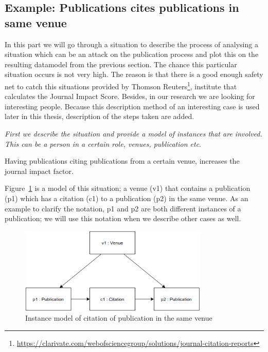 \documentclass{ou-report}
\begin{document}
\subsection{Example: Publications cites publications in same venue}
\label{interesting_case:publications_cites_publications_in_same_venue}
In this part we will go through a situation to describe the process of analysing
a situation which can be an attack on the publication process and plot this on the
resulting datamodel from the previous section. The chance this 
particular situation occurs is not very high. The reason is that there is a good
enough safety net to catch this situations provided by Thomson Reuters\footnote{\url{https://clarivate.com/webofsciencegroup/solutions/journal-citation-reports}}, 
institute that 
calculates the Journal Impact Score. Besides, in our research we are looking for
interesting people. Because this description method of an interesting case is
used later in this thesis, description of the steps taken are added. 

\textit{First we describe the situation and provide a model of instances that 
are involved. This can be a person in a certain role, venues, publication etc}.

Having publications citing publications from a certain venue, increases the 
journal impact factor.

Figure~\ref{fig:cpsv} is a model of this situation; a venue (v1) that
contains a publication (p1) which has a citation (c1) to a publication (p2) in
the same venue. As an example to clarify the notation, p1 and p2 are both 
different instances of a publication; we will use this notation when we describe 
other cases as well.

\begin{figure}[H]
\centering
\includegraphics[width=9cm]{images/cited_publications_same_journal.drawio.png}
\caption{Instance model of citation of publication in the same venue}
\label{fig:cpsv}
\end{figure}

\end{document}
